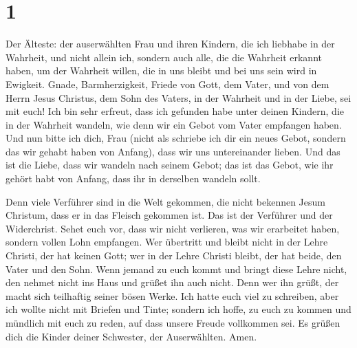 \hypertarget{section}{%
\section{1}\label{section}}

 Der Älteste: der auserwählten Frau und ihren Kindern, die
ich liebhabe in der Wahrheit, und nicht allein ich, sondern auch alle,
die die Wahrheit erkannt haben,  um der Wahrheit willen,
die in uns bleibt und bei uns sein wird in Ewigkeit. 
Gnade, Barmherzigkeit, Friede von Gott, dem Vater, und von dem Herrn
Jesus Christus, dem Sohn des Vaters, in der Wahrheit und in der Liebe,
sei mit euch!  Ich bin sehr erfreut, dass ich gefunden
habe unter deinen Kindern, die in der Wahrheit wandeln, wie denn wir ein
Gebot vom Vater empfangen haben.  Und nun bitte ich dich,
Frau (nicht als schriebe ich dir ein neues Gebot, sondern das wir gehabt
haben von Anfang), dass wir uns untereinander lieben.  Und
das ist die Liebe, dass wir wandeln nach seinem Gebot; das ist das
Gebot, wie ihr gehört habt von Anfang, dass ihr in derselben wandeln
sollt.

 Denn viele Verführer sind in die Welt gekommen, die nicht
bekennen Jesum Christum, dass er in das Fleisch gekommen ist. Das ist
der Verführer und der Widerchrist.  Sehet euch vor, dass
wir nicht verlieren, was wir erarbeitet haben, sondern vollen Lohn
empfangen.  Wer übertritt und bleibt nicht in der Lehre
Christi, der hat keinen Gott; wer in der Lehre Christi bleibt, der hat
beide, den Vater und den Sohn.  Wenn jemand zu euch kommt
und bringt diese Lehre nicht, den nehmet nicht ins Haus und grüßet ihn
auch nicht.  Denn wer ihn grüßt, der macht sich
teilhaftig seiner bösen Werke.  Ich hatte euch viel zu
schreiben, aber ich wollte nicht mit Briefen und Tinte; sondern ich
hoffe, zu euch zu kommen und mündlich mit euch zu reden, auf dass unsere
Freude vollkommen sei.  Es grüßen dich die Kinder deiner
Schwester, der Auserwählten. Amen.
